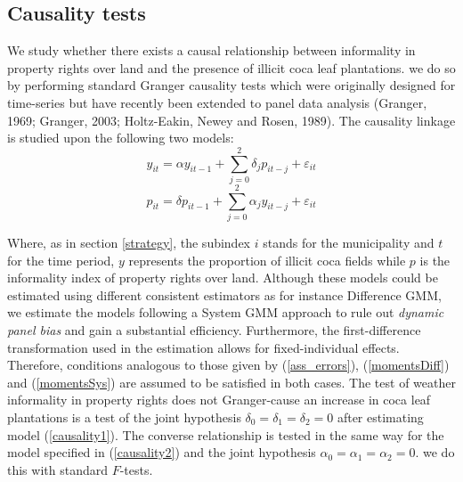 \documentclass[12pt,a4paper,english]{article}%
\begin{document}
\subsection{Causality tests}
\label{causalitytests}

We study whether there exists a causal relationship between informality in property rights over land and the presence of illicit coca leaf plantations. we do so by performing standard Granger causality tests which were originally designed for time-series but have recently been extended to panel data analysis (Granger, 1969; Granger, 2003; Holtz-Eakin, Newey and Rosen, 1989). The causality linkage is studied upon the following two models:
\begin{equation}
\label{causality1}
y_{it}=\alpha y_{it-1}+\sum\limits_{j=0}^{2} \delta_j p_{it-j} + \varepsilon_{it}
\end{equation}
\begin{equation}
\label{causality2}
p_{it}=\delta p_{it-1}+\sum\limits_{j=0}^{2} \alpha_j y_{it-j} + \varepsilon_{it}
\end{equation}

Where, as in section \ref{strategy}, the subindex $i$ stands for the municipality and $t$ for the time period, $y$ represents the proportion of illicit coca fields while $p$ is the informality index of property rights over land. Although these models could be estimated using different consistent estimators as for instance Difference GMM, we estimate the models following a System GMM approach to rule out \emph{dynamic panel bias} and gain a substantial efficiency. Furthermore, the first-difference transformation used in the estimation allows for fixed-individual effects. Therefore, conditions analogous to those given by (\ref{ass_errors}), (\ref{momentsDiff}) and (\ref{momentsSys}) are assumed to be satisfied in both cases. The test of weather informality in property rights does not Granger-cause an increase in coca leaf plantations is a test of the joint hypothesis $\delta_0=\delta_1=\delta_2=0$ after estimating model (\ref{causality1}). The converse relationship is tested in the same way for the model specified in (\ref{causality2}) and the joint hypothesis $\alpha_0=\alpha_1=\alpha_2=0$. we do this with standard $F$-tests.
\end{document}
